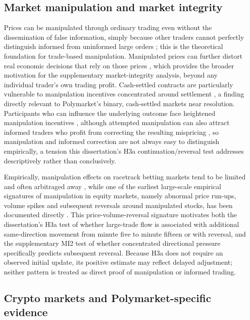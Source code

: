 \subsection{Market manipulation and market integrity}
\label{lr:manipulation}

Prices can be manipulated through ordinary trading even without the dissemination of false information, simply because other traders cannot perfectly distinguish informed from uninformed large orders \citep{allengale1992manipulation}; this is the theoretical foundation for trade-based manipulation. Manipulated prices can further distort real economic decisions that rely on those prices \citep{goldsteinguembel2008manipulation}, which provides the broader motivation for the supplementary market-integrity analysis, beyond any individual trader's own trading profit. Cash-settled contracts are particularly vulnerable to manipulation incentives concentrated around settlement \citep{kumarseppi1992cashsettlement}, a finding directly relevant to Polymarket's binary, cash-settled markets near resolution. Participants who can influence the underlying outcome face heightened manipulation incentives \citep{ottavianisorensen2007outcome}, although attempted manipulation can also attract informed traders who profit from correcting the resulting mispricing \citep{hanson2006aggregation}, so manipulation and informed correction are not always easy to distinguish empirically, a tension this dissertation's H3a continuation/reversal test addresses descriptively rather than conclusively.

Empirically, manipulation effects on racetrack betting markets tend to be limited and often arbitraged away \citep{camerer1998racetrack}, while one of the earliest large-scale empirical signatures of manipulation in equity markets, namely abnormal price run-ups, volume spikes and subsequent reversals around manipulated stocks, has been documented directly \citep{aggarwalwu2006manipulation}. This price-volume-reversal signature motivates both the dissertation's H3a test of whether large-trade flow is associated with additional same-direction movement from minute five to minute fifteen or with reversal, and the supplementary MI2 test of whether concentrated directional pressure specifically predicts subsequent reversal. Because H3a does not require an observed initial update, its positive estimate may reflect delayed adjustment; neither pattern is treated as direct proof of manipulation or informed trading.

\subsection{Crypto markets and Polymarket-specific evidence}
\label{lr:crypto}

